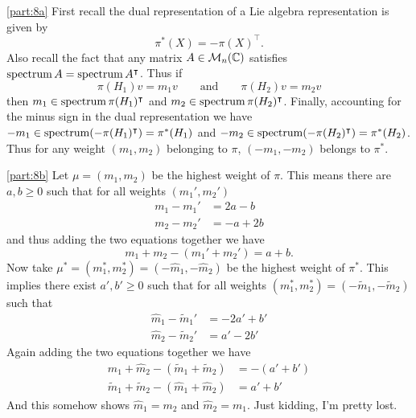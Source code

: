 \documentclass[
	pages,
	boxes,
	color=WildStrawberry
]{homework}
\begin{document}
\begin{solution}
	\ref{part:8a}
	First recall the dual representation of a Lie algebra representation is given by
	\begin{equation*}
		\pi^*(X) = -\pi(X)^\intercal.
	\end{equation*}
	Also recall the fact that any matrix $A\in\mathcal{M}_{n}(\mathbb{C})$ satisfies $\operatorname{spectrum} A = \operatorname{spectrum} A^\intercal$. Thus if
	\begin{equation*}
		\pi(H_1)v = m_1v \qquad \text{and} \qquad \pi(H_2)v = m_2v
	\end{equation*}
	then $m_1\in\operatorname{spectrum} \pi(H_1)^\intercal$ and $m_2\in\operatorname{spectrum} \pi(H_2)^\intercal$. Finally, accounting for the minus sign in the dual representation we have $-m_1\in\operatorname{spectrum}(-\pi(H_1)^\intercal) = \pi^*(H_1)$ and $-m_2\in\operatorname{spectrum}(-\pi(H_2)^\intercal) = \pi^*(H_2)$. Thus for any weight $(m_1, m_2)$ belonging to $\pi$, $(-m_1, -m_2)$ belongs to $\pi^*$.

	\ref{part:8b}
	Let $\mu = (m_1, m_2)$ be the highest weight of $\pi$. This means there are $a, b\geq 0$ such that for all weights $(m_1', m_2')$
	\begin{align*}
		m_1 - m_1' & = 2a - b  \\
		m_2 - m_2' & = -a + 2b
	\end{align*}
	and thus adding the two equations together we have
	\begin{equation*}
		m_1 + m_2 - (m_1' + m_2') = a + b.
	\end{equation*}
	Now take $\mu^* = (m_1^*, m_2^*) = (-\hat{m}_1, -\hat{m}_2)$ be the highest weight of $\pi^*$. This implies there exist $a', b'\geq 0$ such that for all weights $(m_1^*, m_2^*) = (-\tilde{m}_1, -\tilde{m}_2)$ such that
	\begin{align*}
		\hat{m}_1 - \tilde{m}_1' & = -2a' + b' \\
		\hat{m}_2 - \tilde{m}_2' & = a' - 2b'
	\end{align*}
	Again adding the two equations together we have
	\begin{align*}
		\hat{m}_1 + \hat{m}_2 - (\tilde{m}_1 + \tilde{m}_2) & = -(a' + b') \\
		\tilde{m}_1 + \tilde{m}_2 - (\hat{m}_1 + \hat{m}_2) & = a' + b'
	\end{align*}
	And this somehow shows $\hat{m}_1 = m_2$ and $\hat{m}_2 = m_1$. Just kidding, I'm pretty lost.

\end{solution}
\end{document}
